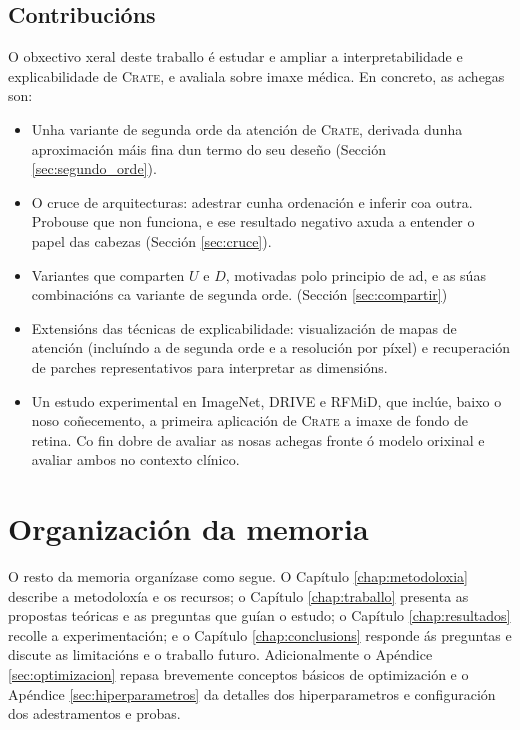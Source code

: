 \subsection{Contribucións}
O obxectivo xeral deste traballo é estudar e ampliar a \gls{interpretabilidade} e \gls{explicabilidade} de \textsc{Crate}, e avaliala sobre imaxe médica. En concreto, as achegas son:
\begin{itemize}
\item Unha variante de segunda orde da atención de \textsc{Crate}, derivada dunha aproximación máis fina dun termo do seu deseño (Sección \ref{sec:segundo_orde}).
\item O cruce de arquitecturas: adestrar cunha ordenación e inferir coa outra. Probouse que non funciona, e ese resultado negativo axuda a entender o papel das cabezas (Sección \ref{sec:cruce}).
\item Variantes que comparten $U$ e $D$, motivadas polo principio de \acrshort{ad}, e as súas combinacións ca variante de segunda orde. (Sección \ref{sec:compartir})
\item Extensións das técnicas de \gls{explicabilidade}: visualización de mapas de atención (incluíndo a de segunda orde e a resolución por \gls{píxel}) e recuperación de parches representativos para interpretar as dimensións.
\item Un estudo experimental en ImageNet, DRIVE e RFMiD, que inclúe, baixo o noso coñecemento, a primeira aplicación de \textsc{Crate} a imaxe de fondo de retina. Co fin dobre de avaliar as nosas achegas fronte ó modelo orixinal e avaliar ambos no contexto clínico.
\end{itemize}

\section{Organización da memoria}

O resto da memoria organízase como segue. O Capítulo \ref{chap:metodoloxia} describe a metodoloxía e os recursos; o Capítulo \ref{chap:traballo} presenta as propostas teóricas e as preguntas que guían o estudo; o Capítulo \ref{chap:resultados} recolle a experimentación; e o Capítulo \ref{chap:conclusions} responde ás preguntas e discute as limitacións e o traballo futuro. Adicionalmente o Apéndice \ref{sec:optimizacion} repasa brevemente conceptos básicos de optimización e o Apéndice \ref{sec:hiperparametros} da detalles dos hiperparametros e configuración dos adestramentos e probas.
